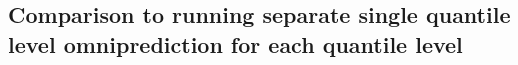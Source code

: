 

\subsection{Comparison to running separate single quantile level omniprediction for each quantile level} \label{subsec:separate_multi_q}

